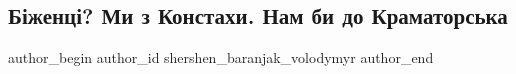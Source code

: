  
 
 
 
 

\subsection{Біженці? Ми з Констахи. Нам би до Краматорська}
\label{sec:25_12_2022.fb.shershen_baranjak_volodymyr.1.b_zhents__mi_z_kons}

\ifcmt
 author_begin
   author_id shershen_baranjak_volodymyr
 author_end
\fi

